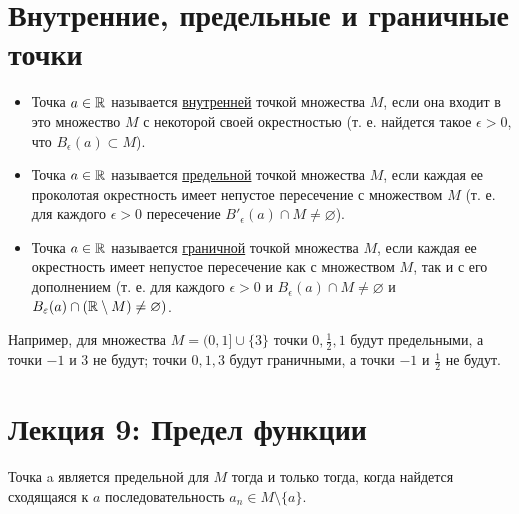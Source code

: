 	\section{Внутренние, предельные и граничные точки}
	
	\begin{definition}
		\begin{itemize}
			\item Точка $a \in \mathbb R$ называется \underline{внутренней} точкой множества $M$, если она входит в это множество $M$ с некоторой своей окрестностью (т. е. найдется такое $\epsilon > 0$, что $B_{\epsilon}(a) \subset M$).
			\item Точка $a \in \mathbb R$ называется \underline{предельной} точкой множества $M$, если каждая ее проколотая окрестность имеет непустое пересечение с множеством $M$ (т. е. для каждого $\epsilon > 0$ пересечение $B'_{\epsilon}(a) \cap M \neq \varnothing$).
			\item Точка $a \in \mathbb R$ называется \underline{граничной} точкой множества $M$, если каждая ее окрестность имеет непустое пересечение как с множеством $M$, так и с его дополнением (т. е. для каждого $\epsilon > 0$ и $B_{\epsilon}(a) \cap M \neq \varnothing$ и $B_{\varepsilon}(a) \cap (\mathbb R \setminus M) \neq \varnothing)$.
		\end{itemize}
	\end{definition}
	
	\begin{example}
		Например, для множества $M = (0, 1] \cup \{3\}$ точки $0, \frac{1}{2}, 1$ будут
		предельными, а точки $-1$ и $3$ не будут; точки $0, 1, 3$ будут граничными, а точки $-1$ и $\frac{1}{2}$ не будут.
	\end{example}
	
	\newpage
	
	\section*{Лекция 9: Предел функции}
	
	\begin{mention}
		Точка a является предельной для $M$ тогда и только тогда, когда найдется сходящаяся к $a$ последовательность $a_n \in M \setminus \{a\}$.
	\end{mention}
	
